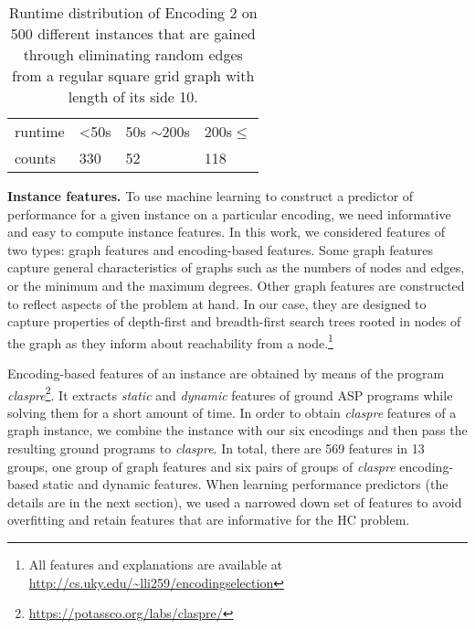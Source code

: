 \documentclass[submission,copyright,creativecommons]{eptcs}
\begin{document}
%




\begin{table}[]
\caption{Runtime distribution of Encoding 2 on 500 different instances that are gained through eliminating random edges from a regular square grid graph with length of its side 10.}\label{fig3}
\label{fig3}
\centering
\footnotesize{
\begin{tabular}{llll}
	\hline\hline
runtime & \textless{}50s & 50s $\sim$200s & 200s$\leq$ \\ 
counts   & 330            & 52             & 118  \\ 
	\hline\hline
\end{tabular}}
\centering
\end{table}

\smallskip
\noindent
\textbf{Instance features.}
To use machine learning to construct a predictor of performance for a given 
instance on a particular encoding, we need informative and easy to compute 
instance features. In this work, we considered features of two types: graph
features and encoding-based features. Some graph features capture general 
characteristics of graphs such as the numbers of nodes and edges, or the 
minimum and the maximum degrees. Other graph features are constructed to 
reflect aspects of the problem at hand. In our case, they are designed to
capture properties of depth-first and breadth-first search trees rooted in 
nodes of the graph as they inform about reachability from a node.\footnote{All 
features and explanations are available at \url{http://cs.uky.edu/~lli259/encodingselection}}  

Encoding-based features of an instance are obtained by means of the program
\emph{claspre}\footnote{\url{https://potassco.org/labs/claspre/}}. It extracts 
\emph{static} and \emph{dynamic} features of ground ASP programs while solving 
them for a short amount of time. In order to obtain \textit{claspre} features 
of a graph instance, we combine the instance with our six encodings and then 
pass the resulting ground programs to \textit{claspre}. 
In total, there are 569 features in 13
groups, one group of graph features and six pairs of groups of \textit{claspre}
encoding-based static and dynamic features. When learning performance 
predictors (the details are in the next section), we used a narrowed down set 
of features to avoid overfitting and retain features that are informative for 
the HC problem.
\end{document}
